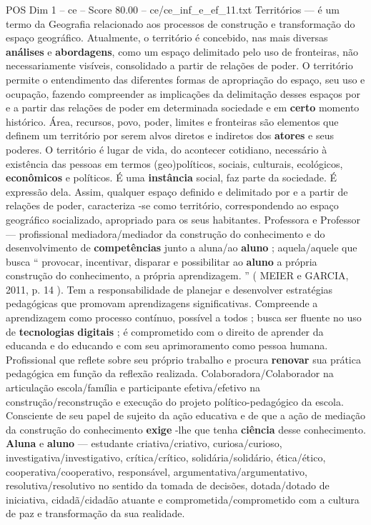 \begin{textsample}{POS Dim 1 – ce – Score 80.00 – ce/ce\_inf\_e\_ef\_11.txt}
Territórios — é um termo da Geografia relacionado aos processos de construção e transformação do espaço geográfico.
Atualmente, o território é concebido, nas mais diversas \textbf{análises} e \textbf{abordagens}, como um espaço delimitado pelo uso de fronteiras, não necessariamente visíveis, consolidado a partir de relações de poder.
O território permite o entendimento das diferentes formas de apropriação do espaço, seu uso e ocupação, fazendo compreender as implicações da delimitação desses espaços por e a partir das relações de poder em determinada sociedade e em \textbf{certo} momento histórico.
Área, recursos, povo, poder, limites e fronteiras são elementos que definem um território por serem alvos diretos e indiretos dos \textbf{atores} e seus poderes.
O território é lugar de vida, do acontecer cotidiano, necessário à existência das pessoas em termos (geo)políticos, sociais, culturais, ecológicos, \textbf{econômicos} e políticos.
É uma \textbf{instância} social, faz parte da sociedade.
É expressão dela.
Assim, qualquer espaço definido e delimitado por e a partir de relações de poder, caracteriza -se como território, correspondendo ao espaço geográfico socializado, apropriado para os seus habitantes.
Professora e Professor — profissional mediadora/mediador da construção do conhecimento e do desenvolvimento de \textbf{competências} junto a aluna/ao \textbf{aluno} ; aquela/aquele que busca “ provocar, incentivar, disparar e possibilitar ao \textbf{aluno} a própria construção do conhecimento, a própria aprendizagem. ” ( MEIER e GARCIA, 2011, p. 14 ).
Tem a responsabilidade de planejar e desenvolver estratégias pedagógicas que promovam aprendizagens significativas.
Compreende a aprendizagem como processo contínuo, possível a todos ; busca ser fluente no uso de \textbf{tecnologias} \textbf{digitais} ; é comprometido com o direito de aprender da educanda e do educando e com seu aprimoramento como pessoa humana.
Profissional que reflete sobre seu próprio trabalho e procura \textbf{renovar} sua prática pedagógica em função da reflexão realizada.
Colaboradora/Colaborador na articulação escola/família e participante efetiva/efetivo na construção/reconstrução e execução do projeto político-pedagógico da escola.
Consciente de seu papel de sujeito da ação educativa e de que a ação de mediação da construção do conhecimento \textbf{exige} -lhe que tenha \textbf{ciência} desse conhecimento. \textbf{Aluna} e \textbf{aluno} — estudante criativa/criativo, curiosa/curioso, investigativa/investigativo, crítica/crítico, solidária/solidário, ética/ético, cooperativa/cooperativo, responsável, argumentativa/argumentativo, resolutiva/resolutivo no sentido da tomada de decisões, dotada/dotado de iniciativa, cidadã/cidadão atuante e comprometida/comprometido com a cultura de paz e transformação da sua realidade.

\end{textsample}
